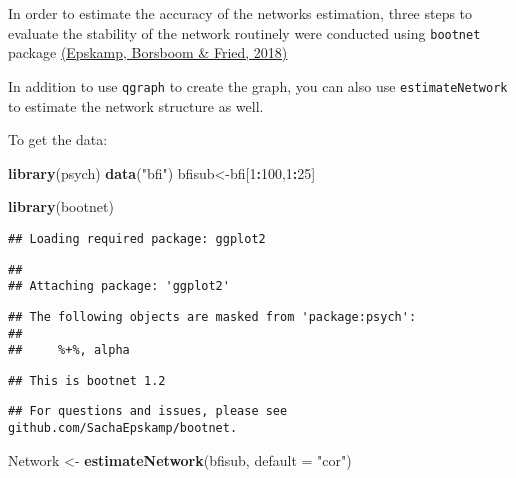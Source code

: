 \documentclass[]{article}
\newenvironment{Shaded}{\begin{snugshade}}{\end{snugshade}}
\newcommand{\KeywordTok}[1]{\textcolor[rgb]{0.13,0.29,0.53}{\textbf{#1}}}
\newcommand{\DataTypeTok}[1]{\textcolor[rgb]{0.13,0.29,0.53}{#1}}
\newcommand{\DecValTok}[1]{\textcolor[rgb]{0.00,0.00,0.81}{#1}}
\newcommand{\StringTok}[1]{\textcolor[rgb]{0.31,0.60,0.02}{#1}}
\newcommand{\OperatorTok}[1]{\textcolor[rgb]{0.81,0.36,0.00}{\textbf{#1}}}
\newcommand{\NormalTok}[1]{#1}
\begin{document}
In order to estimate the accuracy of the networks estimation, three
steps to evaluate the stability of the network routinely were conducted
using \texttt{bootnet} package
\href{https://link.springer.com/article/10.3758/s13428-017-0862-1}{(Epskamp,
Borsboom \& Fried, 2018)}

In addition to use \texttt{qgraph} to create the graph, you can also use
\texttt{estimateNetwork} to estimate the network structure as well.

To get the data:

\begin{Shaded}
\begin{Highlighting}[]
\KeywordTok{library}\NormalTok{(psych)}
\KeywordTok{data}\NormalTok{(}\StringTok{"bfi"}\NormalTok{)}
\NormalTok{bfisub<-bfi[}\DecValTok{1}\OperatorTok{:}\DecValTok{100}\NormalTok{,}\DecValTok{1}\OperatorTok{:}\DecValTok{25}\NormalTok{]}
\end{Highlighting}
\end{Shaded}

\begin{Shaded}
\begin{Highlighting}[]
\KeywordTok{library}\NormalTok{(bootnet)}
\end{Highlighting}
\end{Shaded}

\begin{verbatim}
## Loading required package: ggplot2
\end{verbatim}

\begin{verbatim}
## 
## Attaching package: 'ggplot2'
\end{verbatim}

\begin{verbatim}
## The following objects are masked from 'package:psych':
## 
##     %+%, alpha
\end{verbatim}

\begin{verbatim}
## This is bootnet 1.2
\end{verbatim}

\begin{verbatim}
## For questions and issues, please see github.com/SachaEpskamp/bootnet.
\end{verbatim}

\begin{Shaded}
\begin{Highlighting}[]
\NormalTok{Network <-}\StringTok{ }\KeywordTok{estimateNetwork}\NormalTok{(bfisub, }\DataTypeTok{default =} \StringTok{"cor"}\NormalTok{)}
\end{Highlighting}
\end{Shaded}
\end{document}
